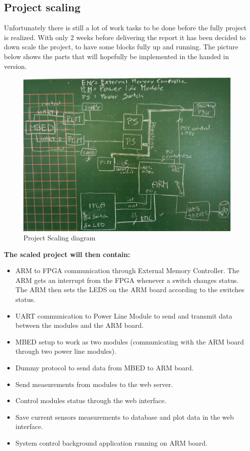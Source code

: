 \subsection{Project scaling}
Unfortunately there is still a lot of work tasks to be done before the fully project is realized. With only 2 weeks before delivering the report it has been decided to down scale the project, to have some blocks fully up and running. The picture below shows the parts that will hopefully be implemented in the handed in version. 
\begin{figure}[H]
	\begin{centering}
		\includegraphics[width=1.0\textwidth]{images/project_scaling_tb6.jpg}
		\caption{Project Scaling diagram}
	\end{centering}
\end{figure}
\textbf{The scaled project will then contain:} 
\begin{itemize}
	\item ARM to FPGA communication through External Memory Controller. The ARM gets an interrupt from the FPGA whenever a switch changes status. The ARM then sets the LEDS on the ARM board according to the switches status.
	\item UART communication to Power Line Module to send and transmit data between the modules and the ARM board.
	\item MBED setup to work as two modules (communicating with the ARM board through two power line modules).
	\item Dummy protocol to send data from MBED to ARM board. 
	\item Send measurements from modules to the web server.
	\item Control modules status through the web interface.
	\item Save current sensors measurements to database and plot data in the web interface.
	\item System control background application running on ARM board.
\end{itemize} 
